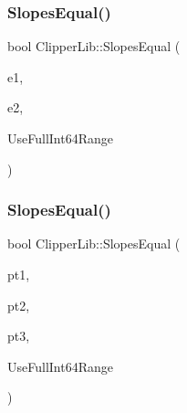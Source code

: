 \subsubsection{\texorpdfstring{SlopesEqual()}{SlopesEqual()}\hspace{0.1cm}{\footnotesize\ttfamily [1/3]}}
{\footnotesize\ttfamily bool Clipper\+Lib\+::\+Slopes\+Equal (\begin{DoxyParamCaption}\item[{const \mbox{\hyperlink{struct_clipper_lib_1_1_t_edge}{T\+Edge}} \&}]{e1,  }\item[{const \mbox{\hyperlink{struct_clipper_lib_1_1_t_edge}{T\+Edge}} \&}]{e2,  }\item[{bool}]{Use\+Full\+Int64\+Range }\end{DoxyParamCaption})}

\mbox{\label{namespace_clipper_lib_a85fe5803e6f06dd9963cb4b222824ff3}} 
\subsubsection{\texorpdfstring{SlopesEqual()}{SlopesEqual()}\hspace{0.1cm}{\footnotesize\ttfamily [2/3]}}
{\footnotesize\ttfamily bool Clipper\+Lib\+::\+Slopes\+Equal (\begin{DoxyParamCaption}\item[{const \mbox{\hyperlink{struct_clipper_lib_1_1_int_point}{Int\+Point}}}]{pt1,  }\item[{const \mbox{\hyperlink{struct_clipper_lib_1_1_int_point}{Int\+Point}}}]{pt2,  }\item[{const \mbox{\hyperlink{struct_clipper_lib_1_1_int_point}{Int\+Point}}}]{pt3,  }\item[{bool}]{Use\+Full\+Int64\+Range }\end{DoxyParamCaption})}

\mbox{\label{namespace_clipper_lib_a5ce63c03021b0da24f00de41a2a72bcd}} 
